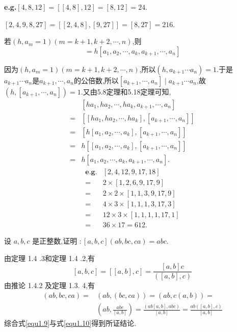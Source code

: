 \textbf{e.g.}$[4,8,12]=[[4,8],12]=[8,12]=24$.

$[2,4,9,8,27]=[[2,4,8],[9,27]]=[8,27]=216$.

\theorem 若$(h,a_{m}=1)(m=k+1,k+2,\cdots,n)$,则
\begin{equation*}
	[ha_{1},ha_{2},\cdots,ha_{k},a_{k+1},\cdots,a_{n}]=h[a_{1},a_{2},\cdots,a_{k},a_{k+1},\cdots,a_{n}]
\end{equation*}

\proof 因为$(h,a_{m}=1)(m=k+1,k+2,\cdots,n)$,所以$(h,a_{k+1}\cdots a_{n})=1$.于是$a_{k+1}\cdots a_{n}$是$a_{k+1},\cdots,a_{n}$的公倍数,所以$[a_{k+1},\cdots,a_{n}]\mid a_{k+1}\cdots a_{n}$,故$(h,[a_{k+1},\cdots,a_{n}])=1$.又由5.8定理和5.18定理可知,
\begin{equation*}
	\begin{split}
		&[ha_{1},ha_{2},\cdots,ha_{k},a_{k+1},\cdots,a_{n}]\\
		=&[[ha_{1},ha_{2},\cdots,ha_{k}],[a_{k+1},\cdots,a_{n}]]\\
		=&[h[a_{1},a_{2},\cdots,a_{k}],[a_{k+1},\cdots,a_{n}]]\\
		=&h[[a_{1},a_{2},\cdots,a_{k}],[a_{k+1},\cdots,a_{n}]]\\
		=&h[a_{1},a_{2},\cdots,a_{k},a_{k+1},\cdots,a_{n}].
	\end{split}
\end{equation*}
\begin{equation*}
	\begin{split}
		\textbf{e.g.}&[2,4,12,9,17,18]\\
		=&2\times[1,2,6,9,17,9]\\
		=&2\times 2\times[1,1,3,9,17,9]\\
		=&4\times 3\times [1,1,1,3,17,3]\\
		=&12\times 3\times[1,1,1,1,17,1]\\
		=&36\times 17=612.
	\end{split}
\end{equation*}

\example 设 $a, b, c$ 是正整数,证明 $:[a, b, c](a b, b c, c a)=a b c$.

\proof 由定理 1.4 .3和定理 1.4 .2,有
\begin{equation}\label{equ1.9}
	[a, b, c]=[[a, b], c]=\frac{[a, b] c}{([a, b], c)}
\end{equation}
由推论 1.4.2 及定理 1.3. 4,有
\begin{equation}\label{equ1.10}
	\begin{split}
		(a b, b c, c a)=&(a b,(b c, c a))=(a b, c(a, b))=\\
		&\left(a b, \frac{a b c}{[a, b]}\right)=\frac{(a b[a, b], a b c)}{[a, b]}=\frac{a b([a, b], c)}{[a, b]}
	\end{split}
\end{equation}
综合式\eqref{equ1.9}与式\eqref{equ1.10}得到所证结论. 

